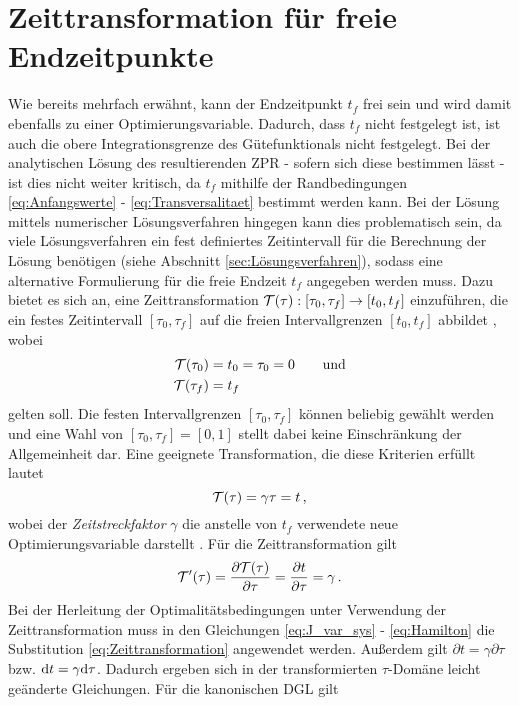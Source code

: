 \section{Zeittransformation für freie Endzeitpunkte}\label{sec:Zeittransformation}
Wie bereits mehrfach erwähnt, kann der Endzeitpunkt $t_f$ frei sein und wird damit ebenfalls zu einer Optimierungsvariable. Dadurch, dass $t_f$ nicht festgelegt ist, ist auch die obere Integrationsgrenze des Gütefunktionals nicht festgelegt. Bei der analytischen Lösung des resultierenden \gls{ZPR} - sofern sich diese bestimmen lässt - ist dies nicht weiter kritisch, da $t_f$ mithilfe der Randbedingungen \eqref{eq:Anfangswerte} - \eqref{eq:Transversalitaet} bestimmt werden kann. Bei der Lösung mittels numerischer Lösungsverfahren hingegen kann dies problematisch sein, da viele Lösungsverfahren ein fest definiertes Zeitintervall für die Berechnung der Lösung benötigen (siehe Abschnitt \ref{sec:Lösungsverfahren}), sodass eine alternative Formulierung für die freie Endzeit $t_f$ angegeben werden muss. Dazu bietet es sich an, eine Zeittransformation $\mathcal{T}(\tau): [\tau_0, \tau_f] \rightarrow [t_0, t_f]$ einzuführen, die ein festes Zeitintervall $[\tau_0, \tau_f]$ auf die freien Intervallgrenzen $[t_0, t_f]$ abbildet \cite{Gerdts.2010}, wobei 
\begin{align}
	\mathcal{T}(\tau_0) &= t_0 = \tau_0 = 0 \qquad \textrm{und} \\
	\mathcal{T}(\tau_f) &= t_f
\end{align}
gelten soll. Die festen Intervallgrenzen $[\tau_0, \tau_f]$ können beliebig gewählt werden und eine Wahl von $[\tau_0, \tau_f] = [0, 1]$ stellt dabei keine Einschränkung der Allgemeinheit dar. Eine geeignete Transformation, die diese Kriterien erfüllt lautet
\begin{equation}
	\mathcal{T}(\tau) = \gamma\tau = t\,, \label{eq:Zeittransformation}
\end{equation}
wobei der \textit{Zeitstreckfaktor} $\gamma$ die anstelle von $t_f$ verwendete neue Optimierungsvariable darstellt \cite{KnutGraichen.2012}. Für die Zeittransformation gilt 
\begin{equation}
	\mathcal{T}'(\tau) = \frac{\partial\mathcal{T}(\tau)}{\partial\tau} = \frac{\partial t}{\partial\tau} = \gamma\,.
\end{equation}
Bei der Herleitung der Optimalitätsbedingungen unter Verwendung der Zeittransformation muss in den Gleichungen \eqref{eq:J_var_sys} - \eqref{eq:Hamilton} die Substitution \eqref{eq:Zeittransformation} angewendet werden. Außerdem gilt $\partial t = \gamma\partial\tau$ bzw. $\textrm{d}{t} = \gamma\textrm{d}{\tau}$. Dadurch ergeben sich in der transformierten $\tau$-Domäne leicht geänderte Gleichungen. Für die kanonischen \gls{DGL} gilt 
